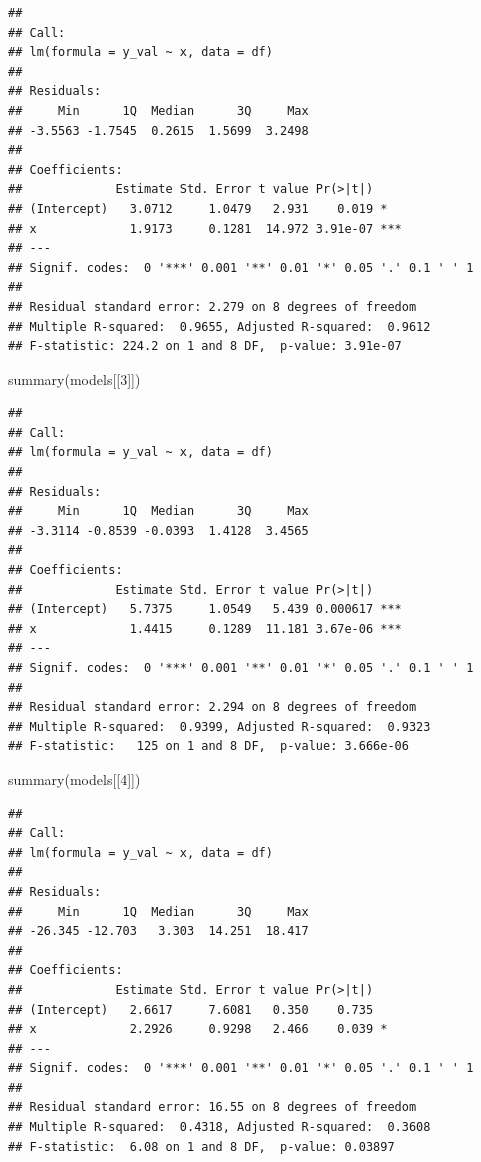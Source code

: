 \documentclass[
]{book}
\newenvironment{Shaded}{\begin{snugshade}}{\end{snugshade}}
\newcommand{\DecValTok}[1]{\textcolor[rgb]{0.00,0.00,0.81}{#1}}
\newcommand{\FunctionTok}[1]{\textcolor[rgb]{0.00,0.00,0.00}{#1}}
\newcommand{\NormalTok}[1]{#1}
\begin{document}
\begin{verbatim}
## 
## Call:
## lm(formula = y_val ~ x, data = df)
## 
## Residuals:
##     Min      1Q  Median      3Q     Max 
## -3.5563 -1.7545  0.2615  1.5699  3.2498 
## 
## Coefficients:
##             Estimate Std. Error t value Pr(>|t|)    
## (Intercept)   3.0712     1.0479   2.931    0.019 *  
## x             1.9173     0.1281  14.972 3.91e-07 ***
## ---
## Signif. codes:  0 '***' 0.001 '**' 0.01 '*' 0.05 '.' 0.1 ' ' 1
## 
## Residual standard error: 2.279 on 8 degrees of freedom
## Multiple R-squared:  0.9655, Adjusted R-squared:  0.9612 
## F-statistic: 224.2 on 1 and 8 DF,  p-value: 3.91e-07
\end{verbatim}

\begin{Shaded}
\begin{Highlighting}[]
\FunctionTok{summary}\NormalTok{(models[[}\DecValTok{3}\NormalTok{]])}
\end{Highlighting}
\end{Shaded}

\begin{verbatim}
## 
## Call:
## lm(formula = y_val ~ x, data = df)
## 
## Residuals:
##     Min      1Q  Median      3Q     Max 
## -3.3114 -0.8539 -0.0393  1.4128  3.4565 
## 
## Coefficients:
##             Estimate Std. Error t value Pr(>|t|)    
## (Intercept)   5.7375     1.0549   5.439 0.000617 ***
## x             1.4415     0.1289  11.181 3.67e-06 ***
## ---
## Signif. codes:  0 '***' 0.001 '**' 0.01 '*' 0.05 '.' 0.1 ' ' 1
## 
## Residual standard error: 2.294 on 8 degrees of freedom
## Multiple R-squared:  0.9399, Adjusted R-squared:  0.9323 
## F-statistic:   125 on 1 and 8 DF,  p-value: 3.666e-06
\end{verbatim}

\begin{Shaded}
\begin{Highlighting}[]
\FunctionTok{summary}\NormalTok{(models[[}\DecValTok{4}\NormalTok{]])}
\end{Highlighting}
\end{Shaded}

\begin{verbatim}
## 
## Call:
## lm(formula = y_val ~ x, data = df)
## 
## Residuals:
##     Min      1Q  Median      3Q     Max 
## -26.345 -12.703   3.303  14.251  18.417 
## 
## Coefficients:
##             Estimate Std. Error t value Pr(>|t|)  
## (Intercept)   2.6617     7.6081   0.350    0.735  
## x             2.2926     0.9298   2.466    0.039 *
## ---
## Signif. codes:  0 '***' 0.001 '**' 0.01 '*' 0.05 '.' 0.1 ' ' 1
## 
## Residual standard error: 16.55 on 8 degrees of freedom
## Multiple R-squared:  0.4318, Adjusted R-squared:  0.3608 
## F-statistic:  6.08 on 1 and 8 DF,  p-value: 0.03897
\end{verbatim}
\end{document}
